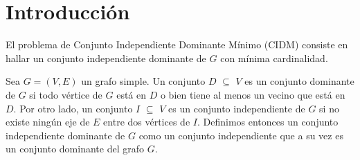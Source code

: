 \documentclass[a4paper]{article}
\begin{document}

\thispagestyle{empty}

\maketitle
\newpage

\thispagestyle{empty}
\vfill
%	
%

\thispagestyle{empty}
\vspace{1.5cm}
\tableofcontents
\newpage

 
\newpage
\section{Introducción}
El problema de Conjunto Independiente Dominante Mínimo (CIDM) consiste en hallar un conjunto independiente dominante de $G$ con mínima cardinalidad.

 Sea $G = (V, E)$ un grafo simple. Un conjunto $D$ $\subseteq$ $V$ es un conjunto dominante de $G$ si todo vértice de $G$ está en $D$ o bien tiene al menos un vecino que está en $D$. Por otro lado, un conjunto $I$ $\subseteq$ $V$ es un conjunto independiente de $G$ si no existe ningún eje de $E$ entre dos vértices de $I$. Definimos entonces un conjunto independiente dominante de $G$ como un conjunto independiente que a su vez es un conjunto dominante del grafo $G$.
\end{document}
